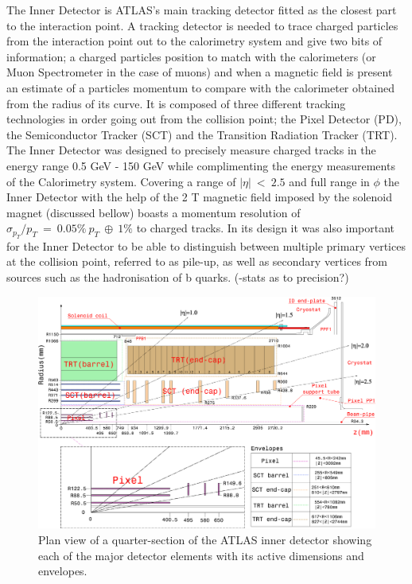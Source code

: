 		The Inner Detector is ATLAS's main tracking detector fitted as the closest part to the interaction point. A tracking detector is needed to trace charged particles from the interaction point out to the calorimetry system and give two bits of information; a charged particles position to match with the calorimeters (or Muon Spectrometer in the case of muons) and when a magnetic field is present an estimate of a particles momentum to compare with the calorimeter obtained from the radius of its curve. It is composed of three different tracking technologies in order going out from the collision point; the Pixel Detector (PD), the Semiconductor Tracker (SCT) and the Transition Radiation Tracker (TRT). The Inner Detector was designed to precisely measure charged tracks in the energy range 0.5 GeV - 150 GeV while complimenting the energy measurements of the Calorimetry system. Covering a range of $|\eta|~<~2.5$ and full range in $\phi$ the Inner Detector with the help of the 2 T magnetic field imposed by the solenoid magnet (discussed bellow) boasts a momentum resolution of $\sigma_{p_{T}}/p_{T}~=~0.05\%~p_{T}~\oplus~1\%$ to charged tracks. In its design it was also important for the Inner Detector to be able to distinguish between multiple primary vertices at the collision point, referred to as pile-up, as well as secondary vertices from sources such as the hadronisation of b quarks. 
		(-stats as to precision?)

		\begin{figure}[h]
			\begin{center}
				\includegraphics[scale=0.3]{images/FigID26-mod-011107.eps}
			\end{center}
			\caption{Plan view of a quarter-section of the ATLAS inner detector showing each of the major
detector elements with its active dimensions and envelopes.}
			\label{fig:ATLAS_inner_config}
		\end{figure}



